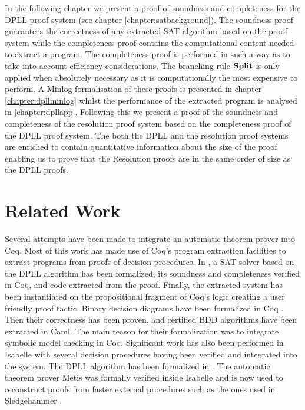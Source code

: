  \label{chapter:dpll}
In the following chapter we present a proof of soundness and completeness for the DPLL proof system (see chapter \ref{chapter:satbackground}). The soundness proof guarantees the correctness of any extracted SAT algorithm based on the proof system while the completeness proof contains the computational content needed to extract a program. The completeness proof is performed in such a way as to take into account efficiency considerations. The branching rule $\mathbf{Split}$ is only applied when absolutely necessary as it is computationally the most expensive to perform. A Minlog formalisation of these proofs is presented in chapter \ref{chapter:dpllminlog} whilst the performance of the extracted program is analysed in \ref{chapter:dpllapp}. Following this we present a proof of the soundness and completeness of the resolution proof system based on the completeness proof of the DPLL proof system. The both the DPLL and the resolution proof systems are enriched to contain quantitative information about the size of the proof enabling us to prove that the Resolution proofs are in the same order of size as the DPLL proofs. 

\section{Related Work}
Several attempts have been made to integrate an automatic theorem prover into Coq. Most of this work has made use of Coq's program extraction facilities to extract programs from proofs of decision procedures.
 In \cite{SL08}, a SAT-solver based on the DPLL algorithm has been
formalized, its soundness and completeness verified in Coq,
and code extracted from the proof.
Finally, the extracted system has been instantiated on the propositional fragment of Coq's logic creating a user friendly proof tactic.  Binary decision diagrams have been formalized in Coq \cite{KV00}. Then their correctness has been proven, and certified BDD algorithms have been extracted in Caml. The main reason for their formalization was to integrate symbolic model checking in Coq.
%
Significant work has also been performed in Isabelle with several decision procedures having been verified and integrated into the system. The DPLL algorithm has been formalized in \cite{FM10}. The automatic theorem prover Metis \cite{LP07} was formally verified inside Isabelle and is now used to reconstruct proofs from faster external procedures such as the ones used in Sledgehammer \cite{SB10}.

